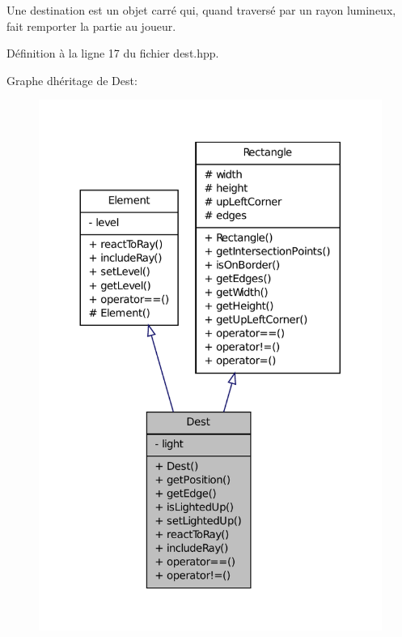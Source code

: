 Une destination est un objet carré qui, quand traversé par un rayon lumineux, fait remporter la partie au joueur. 

Définition à la ligne 17 du fichier dest.\+hpp.



Graphe d\textquotesingle{}héritage de Dest\+:\nopagebreak
\begin{figure}[H]
\begin{center}
\leavevmode
\includegraphics[width=326pt]{d9/d5c/classDest__inherit__graph}
\end{center}
\end{figure}


